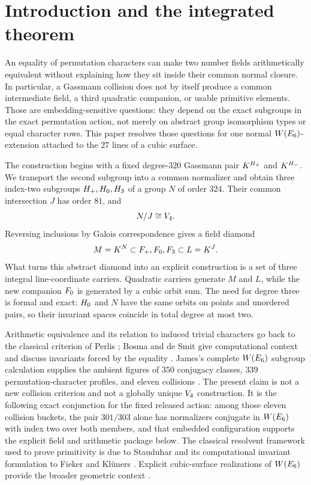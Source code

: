 \section{Introduction and the integrated theorem}
\label{sec:introduction}

An equality of permutation characters can make two number fields
arithmetically equivalent without explaining how they sit inside their common
normal closure.  In particular, a Gassmann collision does not by itself
produce a common intermediate field, a third quadratic companion, or usable
primitive elements.  Those are embedding-sensitive questions: they depend on
the exact subgroups in the exact permutation action, not merely on abstract
group isomorphism types or equal character rows.  This paper resolves those
questions for one normal $W(E_6)$-extension attached to the $27$ lines of a
cubic surface.

The construction begins with a fixed degree-$320$ Gassmann pair
$K^{H_{+}}$ and $K^{H_{-}}$.  We transport the second subgroup into a
common normalizer and obtain three index-two subgroups
$H_{+},H_{0},H_{3}$ of a group $N$ of order $324$.  Their common
intersection $J$ has order $81$, and
\[
  N/J\cong V_4.
\]
Reversing inclusions by Galois correspondence gives a field diamond
\[
 M=K^N\subset F_{+},F_{0},F_{3}\subset L=K^J.
\]
What turns this abstract diamond into an explicit construction is a set of
three integral line-coordinate carriers.  Quadratic carriers generate $M$
and $L$, while the new companion $F_{0}$ is generated by a cubic orbit sum.
The need for degree three is formal and exact: $H_{0}$ and $N$ have the same
orbits on points and unordered pairs, so their invariant spaces coincide in
total degree at most two.

Arithmetic equivalence and its relation to induced trivial characters go
back to the classical criterion of Perlis
\citep[Theorem~1, printed p.~351]{perlis1977equation}; Bosma and de Smit give
computational context and discuss invariants forced by the equality
\citep[printed p.~68]{bosmadesmit2002small}.  James's complete $W(E_6)$ subgroup
calculation supplies the ambient figures of $350$ conjugacy classes, $339$
permutation-character profiles, and eleven collisions
\citep[\S3.1, printed p.~22]{james2022bayesian}.  The present claim is not a
new collision criterion and not a globally unique $V_4$ construction.  It
is the following exact conjunction for the fixed released action: among
those eleven collision buckets, the pair $301/303$ alone has normalizers
conjugate in $W(E_6)$ with index two over both members, and that embedded
configuration supports the explicit field and arithmetic package below.
The classical resolvent framework used to prove primitivity is due to
Stauduhar and its computational invariant formulation to Fieker and Kl\"uners
\citep[pp.~981--984]{stauduhar1973determination}
\citep[\S\S1--2 and Remark~2.1]{fiekerklueners2014computation}.  Explicit
cubic-surface realizations of $W(E_6)$ provide the broader geometric context
\citep{elsenhansjahnel2015moduli}.

